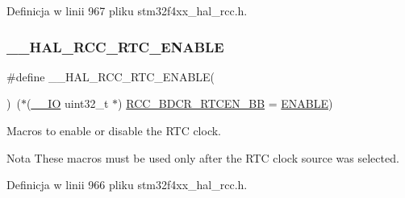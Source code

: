 Definicja w linii 967 pliku stm32f4xx\+\_\+hal\+\_\+rcc.\+h.

\mbox{\label{group___r_c_c___internal___r_t_c___clock___configuration_gab7cc36427c31da645a0e38e181f8ce0f}} 
\subsubsection{\texorpdfstring{\+\_\+\+\_\+\+H\+A\+L\+\_\+\+R\+C\+C\+\_\+\+R\+T\+C\+\_\+\+E\+N\+A\+B\+LE}{\_\_HAL\_RCC\_RTC\_ENABLE}}
{\footnotesize\ttfamily \#define \+\_\+\+\_\+\+H\+A\+L\+\_\+\+R\+C\+C\+\_\+\+R\+T\+C\+\_\+\+E\+N\+A\+B\+LE(\begin{DoxyParamCaption}{ }\end{DoxyParamCaption})~($\ast$(\hyperlink{core__sc300_8h_aec43007d9998a0a0e01faede4133d6be}{\+\_\+\+\_\+\+IO} uint32\+\_\+t $\ast$) \hyperlink{group___r_c_c___bit_address___alias_region_ga583ba8653153b48a06473d0a331f781d}{R\+C\+C\+\_\+\+B\+D\+C\+R\+\_\+\+R\+T\+C\+E\+N\+\_\+\+BB} = \hyperlink{group___exported__types_ggac9a7e9a35d2513ec15c3b537aaa4fba1a7d46875fa3ebd2c34d2756950eda83bf}{E\+N\+A\+B\+LE})}



Macros to enable or disable the R\+TC clock. 

\begin{DoxyNote}{Nota}
These macros must be used only after the R\+TC clock source was selected. 
\end{DoxyNote}


Definicja w linii 966 pliku stm32f4xx\+\_\+hal\+\_\+rcc.\+h.

